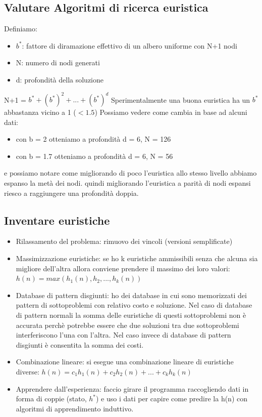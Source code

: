 \documentclass{article}
\begin{document}
\subsection{Valutare Algoritmi di ricerca euristica}
Definiamo:
\begin{itemize}
    \item $b^*$: fattore di diramazione effettivo di un albero uniforme con N+1 nodi
    \item N: numero di nodi generati
    \item d: profondità della soluzione
\end{itemize}
N+1 = $b^* + (b^*)^2 + ... + (b^*)^d$ \newline
Sperimentalmente una buona euristica ha un $b^*$ abbastanza vicino a 1 ($< 1.5$) \newline
Possiamo vedere come cambia in base ad alcuni dati:
\begin{itemize}
    \item con b = 2 otteniamo a profondità d = 6, N = 126
    \item con b = 1.7 otteniamo a profondità d = 6, N = 56
\end{itemize}
e possiamo notare come migliorando di poco l'euristica allo stesso livello abbiamo espanso la metà dei nodi. quindi migliorando l'euristica a parità di nodi espansi riesco a raggiungere una profondità doppia.

\clearpage

\subsection{Inventare euristiche}
\begin{itemize}
    \item Rilassamento del problema: rimuovo dei vincoli (versioni semplificate)
    \item Massimizzazione euristiche: se ho k euristiche ammissibili senza che alcuna sia migliore dell'altra allora conviene prendere il massimo dei loro valori: $h(n)=max(h_1(n),h_2, ..., h_k(n))$
    \item Database di pattern disgiunti: ho dei database in cui sono memorizzati dei pattern di sottoproblemi con relativo costo e soluzione. Nel caso di database di pattern normali la somma delle euristiche di questi sottoproblemi non è accurata perchè potrebbe essere che due soluzioni tra due sottoproblemi interferiscono l'una con l'altra. Nel caso invece di database di pattern disgiunti è consentita la somma dei costi.
    \item Combinazione lineare: si esegue una combinazione lineare di euristiche diverse: $h(n) = c_1h_1(n) + c_2h_2(n) + ... + c_kh_k(n)$
    \item Apprendere dall'esperienza: faccio girare il programma raccogliendo dati in forma di coppie (stato, $h^*$) e uso i dati per capire come predire la h(n) con algoritmi di apprendimento induttivo.
\end{itemize}
\end{document}
